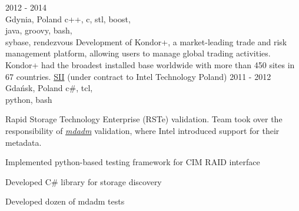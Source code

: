       {2012 - 2014\\Gdynia, Poland}
      {c++, c, stl, boost,\\java, groovy, bash,\\sybase, rendezvous}
      {Development of Kondor+, a market-leading trade and risk management platform,
        allowing users to manage global trading activities. Kondor+ had the broadest
        installed base worldwide with more than 450 sites in 67 countries.
      }
      {\href{https://sii.pl/en/}{SII} (under contract to Intel Technology Poland)}
      {2011 - 2012\\Gdańsk, Poland}
      {c\#, tcl,\\python, bash}
      {Rapid Storage Technology Enterprise (RSTe) validation. Team took over the responsibility
        of \href{https://en.wikipedia.org/wiki/Mdadm}{\emph{mdadm}} validation, where Intel
        introduced support for their metadata.
        \begin{missions}
        \item Implemented python-based testing framework for CIM RAID interface
        \item Developed C\# library for storage discovery
        \item Developed dozen of mdadm tests
        \end{missions}
      }      
      
